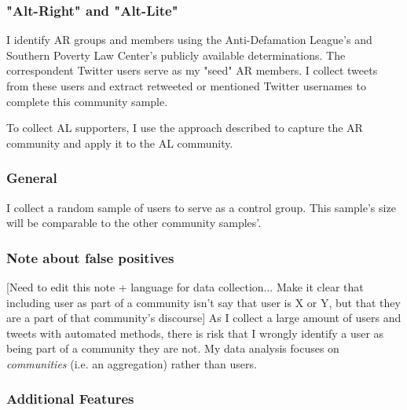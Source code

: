 \documentclass[acmlarge, screen, authorversion]{acmart}
\begin{document}
    \subsubsection{"Alt-Right" and "Alt-Lite"}
    
    I identify AR groups and members using the Anti-Defamation League's \cite{anti-defamationleagueAltRightAlt} and Southern Poverty Law Center's \cite{southernpovertylawcenterAltRight} publicly available determinations. The correspondent Twitter users serve as my "seed" AR members. I collect tweets from these users and extract retweeted or mentioned Twitter usernames to complete this community sample.
    
    To collect AL supporters, I use the approach described to capture the AR community and apply it to the AL community.
    
    \subsubsection{General}
    
    I collect a random sample of users to serve as a control group. This sample's size will be comparable to the other community samples'.
    
    
    
    \subsubsection{Note about false positives} [Need to edit this note + language for data collection... Make it clear that including user as part of a community isn't say that user is X or Y, but that they are a part of that community's discourse]  As I collect a large amount of users and tweets with automated methods, there is risk that I wrongly identify a user as being part of a community they are not. My data analysis focuses on \textit{communities} (i.e. an aggregation) rather than users. 
    

    \subsubsection{Additional Features}
    
\end{document}

